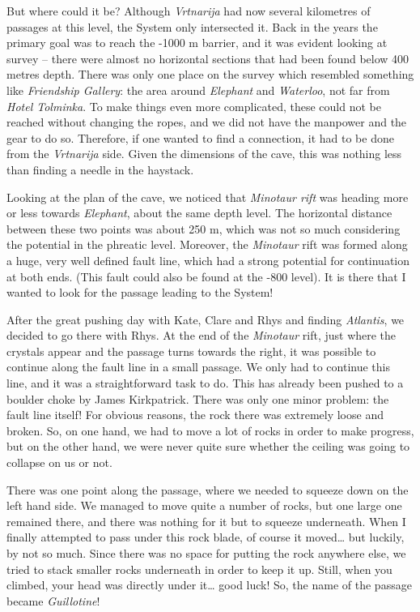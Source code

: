 But where could it be? Although \emph{Vrtnarija} had now several
kilometres of passages at this level, the System only intersected it.
Back in the years the primary goal was to reach the -1000 m barrier, and
it was evident looking at survey -- there were almost no horizontal
sections that had been found below 400 metres depth. There was only one
place on the survey which resembled something like \emph{Friendship
Gallery}: the area around \emph{Elephant} and \emph{Waterloo}, not far
from \emph{Hotel Tolminka}. To make things even more complicated, these
could not be reached without changing the ropes, and we did not have the
manpower and the gear to do so. Therefore, if one wanted to find a
connection, it had to be done from the \emph{Vrtnarija} side. Given the
dimensions of the cave, this was nothing less than finding a needle in
the haystack.

Looking at the plan of the cave, we noticed that \emph{Minotaur rift}
was heading more or less towards \emph{Elephant}, about the same depth
level. The horizontal distance between these two points was about 250 m,
which was not so much considering the potential in the phreatic level.
Moreover, the \emph{Minotaur} rift was formed along a huge, very well
defined fault line, which had a strong potential for continuation at
both ends. (This fault could also be found at the -800 level). It is
there that I wanted to look for the passage leading to the System!

After the great pushing day with Kate, Clare and Rhys and finding
\emph{Atlantis}, we decided to go there with Rhys. At the end of the
\emph{Minotaur} rift, just where the crystals appear and the passage
turns towards the right, it was possible to continue along the fault
line in a small passage. We only had to continue this line, and it was a
straightforward task to do. This has already been pushed to a boulder
choke by James Kirkpatrick. There was only one minor problem: the fault
line itself! For obvious reasons, the rock there was extremely loose and
broken. So, on one hand, we had to move a lot of rocks in order to make
progress, but on the other hand, we were never quite sure whether the
ceiling was going to collapse on us or not.

There was one point along the passage, where we needed to squeeze down
on the left hand side. We managed to move quite a number of rocks, but
one large one remained there, and there was nothing for it but to
squeeze underneath. When I finally attempted to pass under this rock
blade, of course it moved\ldots{} but luckily, by not so much. Since
there was no space for putting the rock anywhere else, we tried to stack
smaller rocks underneath in order to keep it up. Still, when you
climbed, your head was directly under it\ldots{} good luck! So, the name
of the passage became \emph{Guillotine}!

